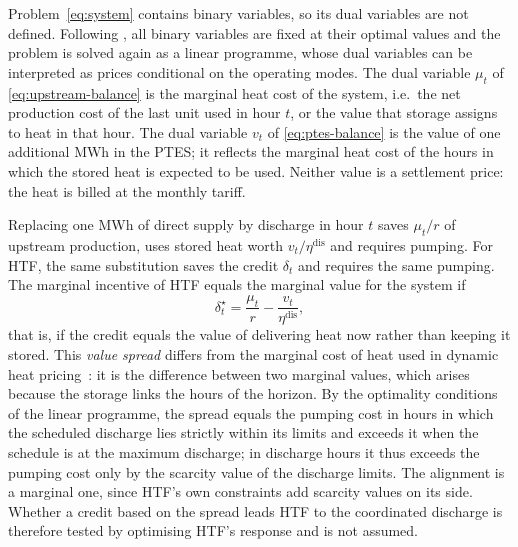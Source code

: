 Problem~\eqref{eq:system} contains binary variables, so its dual variables are not defined. Following \citet{oneill2005efficient}, all binary variables are fixed at their optimal values and the problem is solved again as a linear programme, whose dual variables can be interpreted as prices conditional on the operating modes. The dual variable $\mu_t$ of \cref{eq:upstream-balance} is the marginal heat cost of the system, i.e.\ the net production cost of the last unit used in hour $t$, or the value that storage assigns to heat in that hour. The dual variable $v_t$ of \cref{eq:ptes-balance} is the value of one additional MWh in the PTES; it reflects the marginal heat cost of the hours in which the stored heat is expected to be used. Neither value is a settlement price: the heat is billed at the monthly tariff.

Replacing one MWh of direct supply by discharge in hour $t$ saves $\mu_t/r$ of upstream production, uses stored heat worth $v_t/\eta^{\mathrm{dis}}$ and requires pumping. For HTF, the same substitution saves the credit $\delta_t$ and requires the same pumping. The marginal incentive of HTF equals the marginal value for the system if
\begin{equation}
\delta^{\star}_t = \frac{\mu_t}{r} - \frac{v_t}{\eta^{\mathrm{dis}}},
\label{eq:value-spread}
\end{equation}
that is, if the credit equals the value of delivering heat now rather than keeping it stored. This \emph{value spread} differs from the marginal cost of heat used in dynamic heat pricing~\cite{dominkovic2018influence,liu2019marginal}: it is the difference between two marginal values, which arises because the storage links the hours of the horizon. By the optimality conditions of the linear programme, the spread equals the pumping cost in hours in which the scheduled discharge lies strictly within its limits and exceeds it when the schedule is at the maximum discharge; in discharge hours it thus exceeds the pumping cost only by the scarcity value of the discharge limits. The alignment is a marginal one, since HTF's own constraints add scarcity values on its side. Whether a credit based on the spread leads HTF to the coordinated discharge is therefore tested by optimising HTF's response and is not assumed.

